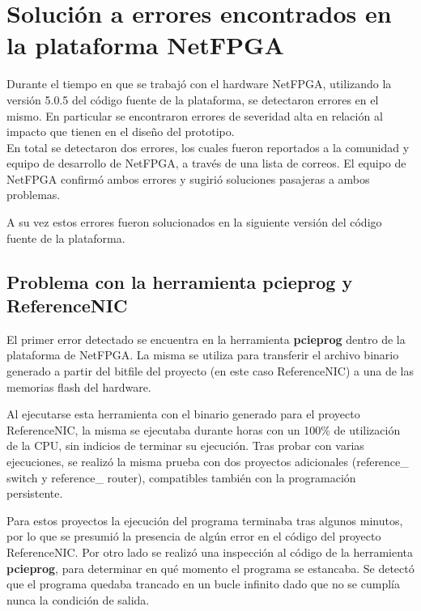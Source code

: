 \chapter{Soluci\'on a errores encontrados en la plataforma NetFPGA} 
\label{apendiceA}

Durante el tiempo en que se trabaj\'o con el hardware NetFPGA, utilizando la versi\'on 5.0.5 del c\'odigo fuente de la plataforma, se detectaron errores en el mismo. En particular se encontraron errores de severidad alta en relaci\'on al impacto que tienen en el diseño del prototipo.\\

En total se detectaron dos errores, los cuales fueron reportados a la comunidad y equipo de desarrollo de NetFPGA, a través de una lista de correos\citep{NetFPGABetaMailing}. El equipo de NetFPGA confirm\'o ambos errores y sugirió soluciones pasajeras a ambos problemas.

A su vez estos errores fueron solucionados en la siguiente versi\'on del c\'odigo fuente de la plataforma.
 
\section{Problema con la herramienta pcieprog y ReferenceNIC}
El primer error detectado se encuentra en la herramienta \textbf{pcieprog} dentro de la plataforma de NetFPGA. La misma se utiliza para transferir el archivo binario generado a partir del bitfile del proyecto (en este caso ReferenceNIC) a una de las memorias flash del hardware.

Al ejecutarse esta herramienta con el binario generado para el proyecto ReferenceNIC, la misma se ejecutaba durante horas con un 100\% de utilizaci\'on de la CPU, sin indicios de terminar su ejecución. Tras probar con varias ejecuciones, se realiz\'o la misma prueba con dos proyectos adicionales (reference\_ switch y reference\_ router), compatibles también con la programaci\'on persistente. 

Para estos proyectos la ejecución del programa terminaba tras algunos minutos, por lo que se presumi\'o la presencia de algún error en el c\'odigo del proyecto ReferenceNIC. Por otro lado se realiz\'o una inspecci\'on al c\'odigo de la herramienta \textbf{pcieprog}, para determinar en qu\'e momento el programa se estancaba. Se detect\'o que el programa quedaba trancado en un bucle infinito dado que no se cumplía nunca la condici\'on de salida.\\ 

